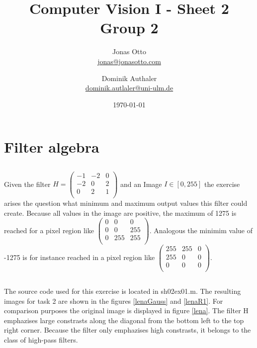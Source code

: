 \documentclass{article}
\title{Computer Vision I - Sheet 2\\Group 2\\}
\author{ Jonas Otto\\ \href{mailto:jonas@jonasotto.com}{jonas@jonasotto.com} \and Dominik Authaler \\ 
\href{mailto:dominik.autaler@uni-ulm.de}{dominik.autlaler@uni-ulm.de}
}
\date{\today}
\begin{document}
\maketitle

\newpage

\section{Filter algebra}

\subsection{}
Given the filter $H = \left(\begin{array}{rrr}-1 & -2 & 0\\-2 & 0 & 2\\0 & 2 & 1\\\end{array}\right)$ and an Image $I \in [0, 255]$ the exercise arises the question what minimum and maximum output values this filter could create. Because all values in the image are positive, the maximum of 1275 is reached for a pixel region like $\left(\begin{array}{rrr}0 & 0 & 0\\0 & 0 & 255\\0 & 255 & 255\\\end{array}\right) $. Analogous the minimim value of -1275 is for instance reached in a pixel region like $\left(\begin{array}{rrr}255 & 255 & 0\\255 & 0 & 0\\0 & 0 & 0\\\end{array}\right)$.

\subsection{}
The source code used for this exercise is located in sh02ex01.m. The resulting images for task 2 are shown in the figures \ref{lenaGauss} and \ref{lenaR1}. For comparison purposes the original image is displayed in figure \ref{lena}. The filter H emphazises large constrasts along the diagonal from the bottom left to the top right corner. Because the filter only emphazises high constrasts, it belongs to the class of high-pass filters.
\end{document}
